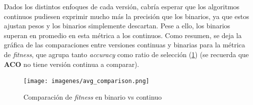 Dados los distintos enfoques de cada versión, cabría esperar que los algoritmos continuos pudiesen exprimir mucho más la precisión que los binarios, ya que estos ajustan pesos y los binarios simplemente descartan. Pese a ello, los binarios superan en promedio en esta métrica a los continuos. Como resumen, se deja la gráfica de las comparaciones entre versiones continuas y binarias para la métrica de \textit{fitness}, que agrupa tanto \textit{accuracy} como ratio de selección (\ref{fig:bin_vs_real_avg}) (se recuerda que \textbf{ACO} no tiene versión continua a comparar).

\begin{figure}[htp]
    \texttt{[image: imagenes/avg\_comparison.png]}
    \caption{Comparación de \textit{fitness} en binario vs continuo}
    \label{fig:bin_vs_real_avg}
\end{figure}

